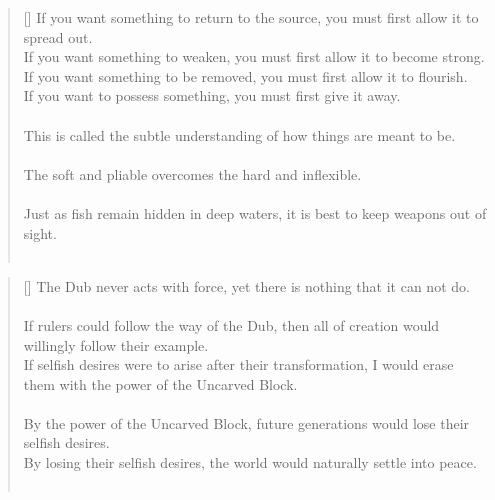 \documentclass{article}
\begin{document}
\settowidth{\versewidth}{The Wizard leads byemptying people’s minds, filling their bellies, weakening their am- bitions, and making them become strong}
\begin{verse}[\versewidth]
If you want something to return to the source, you must first allow it to spread out.\\
If you want something to weaken, you must first allow it to become strong.\\
If you want something to be removed, you must first allow it to flourish.\\
If you want to possess something, you must first give it away.\\
\hfill\\
This is called the subtle understanding of how things are meant to be.\\
\hfill\\
The soft and pliable overcomes the hard and inflexible.\\
\hfill\\
Just as fish remain hidden in deep waters, it is best to keep weapons out of sight.\\
\hfill\\
\end{verse}

\settowidth{\versewidth}{The Wizard leads byemptying people’s minds, filling their bellies, weakening their am- bitions, and making them become strong}
\begin{verse}[\versewidth]
The Dub never acts with force, yet there is nothing that it can not do.\\
\hfill\\
If rulers could follow the way of the Dub, then all of creation would willingly follow their example.\\
If selfish desires were to arise after their transformation,
I would erase them with the power of the Uncarved Block.\\
\hfill\\
By the power of the Uncarved Block, future generations would lose their selfish desires.\\
By losing their selfish desires, the world would naturally settle into peace.\\
\hfill\\
\end{verse}
\end{document}
